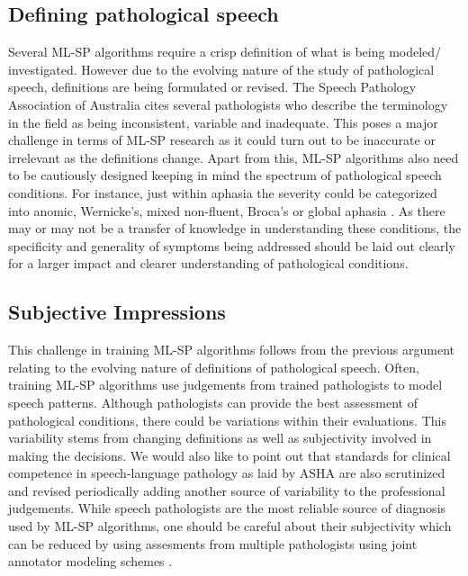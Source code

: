\documentclass{article}
\begin{document}
\subsection{Defining pathological speech}
Several ML-SP algorithms require a crisp definition of what is being modeled/ investigated.
However due to the evolving nature of the study of pathological speech, definitions are being formulated or revised. 
The Speech Pathology Association of Australia \cite{australia2009criteria} cites several pathologists who describe the terminology in the field as being inconsistent, variable and inadequate. 
This poses a major challenge in terms of ML-SP research as it could turn out to be inaccurate or irrelevant as the definitions change.
Apart from this, ML-SP algorithms also need to be cautiously designed keeping in mind the spectrum of pathological speech conditions.
For instance, just within aphasia the severity could be categorized into anomic, Wernicke's, mixed non-fluent, Broca's or global aphasia \cite{mesulam1992primary}. 
As there may or may not be a transfer of knowledge in understanding these conditions, the specificity and generality of symptoms being addressed should be laid out clearly for a larger impact and clearer understanding of pathological conditions. 


\subsection{Subjective Impressions}
This challenge in training ML-SP algorithms follows from the previous argument relating to the evolving nature of definitions of pathological speech.
Often, training ML-SP algorithms use judgements from trained pathologists \cite{} to model speech patterns.
Although pathologists can provide the best assessment of pathological conditions, there could be variations within their evaluations. 
This variability stems from changing definitions as well as subjectivity involved in making the decisions.
We would also like to point out that standards for clinical competence in speech-language pathology \cite{} as laid by ASHA are also scrutinized and revised periodically adding another source of variability to the professional judgements. 
While speech pathologists are the most reliable source of diagnosis used by ML-SP algorithms, one should be careful about their subjectivity which can be reduced by using assesments from multiple pathologists using joint annotator modeling schemes \cite{}. 
\end{document}
